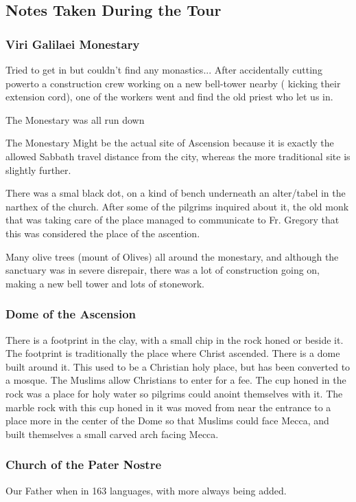 \documentclass[letterpaper]{report}
\begin{document}
\subsection{Notes Taken During the Tour}
\begin{multicols}{2}
\subsubsection{Viri Galilaei Monestary}
Tried to get in but couldn't find any monastics... After accidentally cutting powerto
a construction crew working on a new bell-tower nearby ( kicking their extension cord),
one of the workers went and find the old priest who let us in.

The Monestary was all run down

The Monestary Might be the actual site of Ascension because it is exactly the allowed Sabbath travel distance from the city, whereas the more traditional site is slightly further.

There was a smal black dot, on a kind of bench underneath an alter/tabel in the narthex of the church.
After some of the pilgrims inquired about it,
the old monk that was taking care of the place managed to communicate to Fr. Gregory that this was considered the place
of the ascention.

Many olive trees (mount of Olives) all around the monestary,
and although the sanctuary was in severe
disrepair,
there was a lot of construction going on,
making a new bell tower and lots of stonework.


\subsubsection{Dome of the Ascension}
There is a footprint in the clay, with a small chip in the rock honed or beside it.
The footprint is traditionally the place where Christ ascended. There is a dome built around it. This used to be a Christian holy place, but has been converted to a mosque. The Muslims allow Christians to enter for a fee.
The cup honed in the rock was a place for holy water so pilgrims could anoint themselves with it. The marble rock with this cup honed in it was moved from near the entrance to a place more in the center of the Dome so that Muslims could face Mecca, and built themselves a small carved arch facing Mecca.

\subsubsection{Church of the Pater Nostre}
Our Father when in 163 languages, with more always being added.


\end{multicols}
\end{document}
